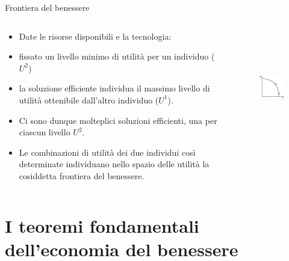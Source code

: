 \documentclass[aspectratio=64,12pt]{beamer}
\begin{document}
\begin{frame}{Frontiera del benessere}
\begin{columns}
\begin{column}{.5\columnwidth}
\begin{itemize}
\item Date le risorse disponibili e la tecnologia:
\item fissato un livello minimo di utilità per un individuo ($U^2$)
\item la soluzione efficiente individua il massimo livello di utilità ottenibile dall’altro individuo ($U^1$).
\item Ci sono dunque molteplici soluzioni efficienti, una per ciascun livello $U^2$.
\item Le combinazioni di utilità dei due individui così determinate individuano nello spazio delle utilità la cosiddetta \alert{frontiera del benessere}.
\end{itemize}
\end{column}
\begin{column}{.5\columnwidth}
\begin{figure}[htbp]
\centering
\includegraphics[height=5cm]{./figure/frontiere-2.pdf}
\end{figure}
\end{column}
\end{columns}
\end{frame}

\section{I teoremi fondamentali dell'economia del benessere}
\end{document}
